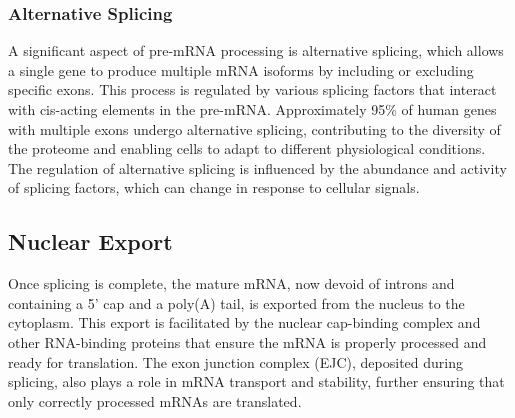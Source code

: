 \subsubsection{Alternative Splicing}
A significant aspect of pre-mRNA processing is alternative splicing, which
allows a single gene to produce multiple mRNA isoforms by including or
excluding specific exons.
This process is regulated by various splicing factors that interact with
cis-acting elements in the
pre-mRNA\supercite{le_alternative_2015,murphy_therapeutic_2022}.
Approximately 95\% of human genes with multiple exons undergo alternative
splicing, contributing to the diversity of the proteome and enabling cells to
adapt to different physiological conditions\supercite{le_alternative_2015}.
The regulation of alternative splicing is influenced by the abundance and
activity of splicing factors, which can change in response to cellular
signals\supercite{wang_mechanism_2015}.

\subsection{Nuclear Export}
Once splicing is complete, the mature mRNA, now devoid of introns and
containing a 5' cap and a poly(A) tail, is exported from the nucleus to the
cytoplasm.
This export is facilitated by the nuclear cap-binding complex and other
RNA-binding proteins that ensure the mRNA is properly processed and ready for
translation\supercite{soucek_evolutionarily_2016}.
The exon junction complex (EJC), deposited during splicing, also plays a role
in mRNA transport and stability, further ensuring that only correctly processed
mRNAs are translated\supercite{hir_exon_2016}.
